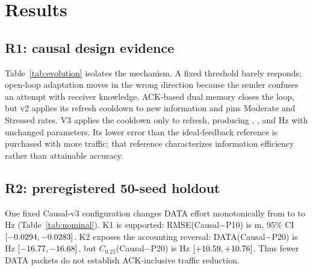 \section{Results}
\label{sec:results}

\subsection{R1: causal design evidence}
\label{sec:evolution}
\begin{table}[t]
\centering
\caption{Frozen v1--v3 design chain. DATA rates are \textbf{per channel};
P10 is exactly 10 Hz. The ideal-feedback row is an efficiency reference,
not an accuracy bound. RMSE entries are mean $\pm$ standard deviation over
20 seeds.}
\label{tab:evolution}
\scriptsize

\end{table}

Table~\ref{tab:evolution} isolates the mechanism. A fixed threshold barely
responds; open-loop adaptation moves in the wrong direction because the sender
confuses an attempt with receiver knowledge. ACK-based dual memory closes the
loop, but v2 applies its refresh cooldown to new information and pins Moderate
and Stressed rates. V3 applies the cooldown only to refresh, producing
\MetricSevenAfivecCleanRate{}, \MetricSevenAfivecModerateRate{}, and
\MetricSevenAfivecStressedRate{} Hz with unchanged parameters. Its lower error
than the ideal-feedback reference is purchased with more traffic; that
reference characterizes information efficiency rather than attainable
accuracy.

\subsection{R2: preregistered 50-seed holdout}
\begin{table}[t]
\centering
\caption{Nominal holdout, \MetricSeeds{} unseen seeds. Rates are
\textbf{swarm totals}; $C_{0.25}=$DATA$+0.25$ACK.}
\label{tab:nominal}
\scriptsize
\resizebox{\columnwidth}{!}{}
\end{table}

\begin{table}[t]
\centering
\caption{Paired Stressed-cell holdout claims, \MetricSeeds{} matched pairs;
rates are swarm totals.}
\label{tab:paired}
\scriptsize

\end{table}

One fixed Causal-v3 configuration changes DATA effort monotonically from
\MetricDataCausalClean{} to \MetricDataCausalModerate{} to
\MetricDataCausalStressed{} Hz (Table~\ref{tab:nominal}). K1 is supported:
RMSE(Causal$-$P10) is \MetricKoneMean{} m, 95\% CI
$[-0.0294{},-0.0283{}]$. K2 exposes the accounting reversal:
DATA(Causal$-$P20) is \MetricKtwoaMean{} Hz
$[-16.77{},-16.68{}]$, but $C_{0.25}$(Causal$-$P20) is
\MetricKtwobMean{} Hz $[+10.59{},+10.76{}]$. Thus fewer
DATA packets do not establish ACK-inclusive traffic reduction.

